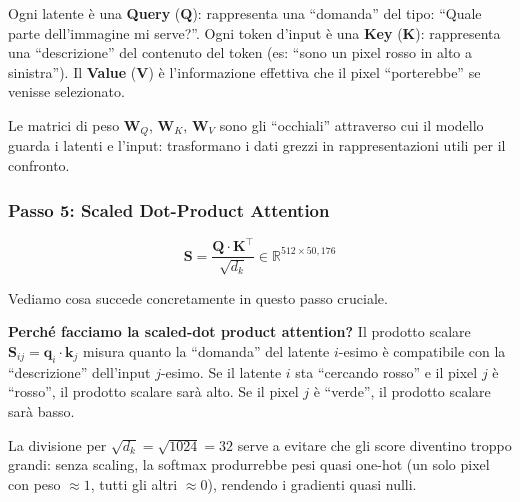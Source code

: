 \documentclass[12pt,a4paper]{article}
\begin{document}
\begin{notabox}[title={Intuizione: Query, Key, Value}]
Ogni latente \`e una \textbf{Query} ($\mathbf{Q}$): rappresenta una ``domanda'' del tipo: ``Quale parte dell'immagine mi serve?''. Ogni token d'input \`e una \textbf{Key} ($\mathbf{K}$): rappresenta una ``descrizione'' del contenuto del token (es: ``sono un pixel rosso in alto a sinistra''). Il \textbf{Value} ($\mathbf{V}$) \`e l'informazione effettiva che il pixel ``porterebbe'' se venisse selezionato.

Le matrici di peso $\mathbf{W}_Q$, $\mathbf{W}_K$, $\mathbf{W}_V$ sono gli ``occhiali'' attraverso cui il modello guarda i latenti e l'input: trasformano i dati grezzi in rappresentazioni utili per il confronto.
\end{notabox}

\subsubsection{Passo 5: Scaled Dot-Product Attention} \label{sec:scaled_dot}

\begin{formulabox}
\[
    \mathbf{S} = \frac{\mathbf{Q} \cdot \mathbf{K}^\top}{\sqrt{d_k}} \in \mathbb{R}^{512 \times 50{,}176}
\]
\end{formulabox}

Vediamo cosa succede concretamente in questo passo cruciale.

\textbf{Perch\'e facciamo la scaled-dot product attention?} Il prodotto scalare $\mathbf{S}_{ij} = \mathbf{q}_i \cdot \mathbf{k}_j$ misura quanto la ``domanda'' del latente $i$-esimo \`e compatibile con la ``descrizione'' dell'input $j$-esimo. Se il latente $i$ sta ``cercando rosso'' e il pixel $j$ \`e ``rosso'', il prodotto scalare sar\`a alto. Se il pixel $j$ \`e ``verde'', il prodotto scalare sar\`a basso.

La divisione per $\sqrt{d_k} = \sqrt{1024} = 32$ serve a evitare che gli score diventino troppo grandi: senza scaling, la softmax produrrebbe pesi quasi one-hot (un solo pixel con peso $\approx 1$, tutti gli altri $\approx 0$), rendendo i gradienti quasi nulli.
\end{document}
